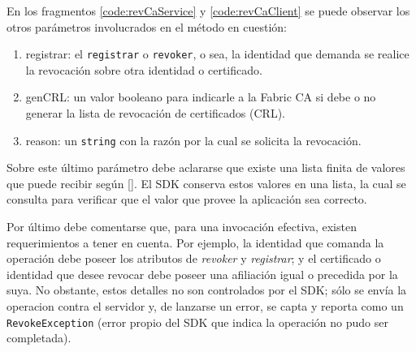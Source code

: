 En los fragmentos \ref{code:revCaService} y \ref{code:revCaClient} se puede observar los otros par\'ametros involucrados en el m\'etodo en cuesti\'on: 

\begin{enumerate}
	\item registrar: el \texttt{registrar} o \texttt{revoker}, o sea, la identidad que demanda se realice la revocaci\'on sobre otra identidad o certificado.
	
	\item genCRL: un valor booleano para indicarle a la Fabric CA si debe o no generar la lista de revocación de certificados (CRL).
	
	\item reason: un \texttt{string} con la raz\'on por la cual se solicita la revocaci\'on.
\end{enumerate}


Sobre este \'ultimo par\'ametro debe aclararse que existe una lista finita de valores que puede recibir seg\'un [\cite{cooper2008internet}]. El SDK conserva estos valores en una lista, la cual se consulta para verificar que el valor que provee la aplicaci\'on sea correcto.%

Por \'ultimo debe comentarse que, para una invocaci\'on efectiva, existen requerimientos a tener en cuenta. Por ejemplo, la identidad que comanda la operaci\'on debe poseer los atributos de \emph{revoker} y \emph{registrar}; y el certificado o identidad que desee revocar debe poseer una afiliaci\'on igual o precedida por la suya. No obstante, estos detalles no son controlados por el SDK; s\'olo se env\'ia la operacion contra el servidor y, de lanzarse un error, se capta y reporta como un \texttt{RevokeException} (error propio del SDK que indica la operaci\'on no pudo ser completada).



